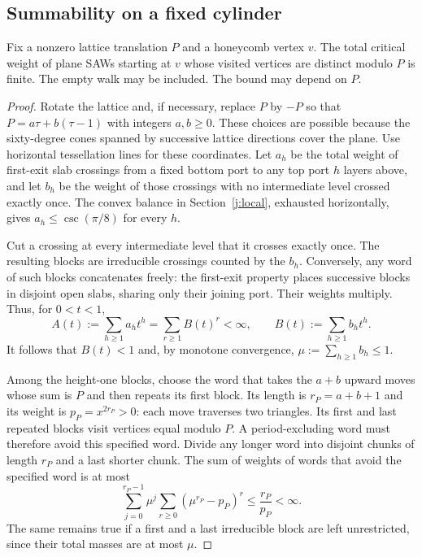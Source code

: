 \subsection{Summability on a fixed cylinder}

\begin{lemma}\label{j:period-excluded}
Fix a nonzero lattice translation $P$ and a honeycomb vertex $v$.
The total critical weight of plane SAWs starting at $v$ whose
visited vertices are distinct modulo $P$ is finite. The empty walk
may be included. The bound may depend on $P$.
\end{lemma}

\begin{proof}
Rotate the lattice and, if necessary, replace $P$ by $-P$ so that
$P=a\tau+b(\tau-1)$ with integers $a,b\ge0$. These choices are
possible because the sixty-degree cones spanned by successive
lattice directions cover the plane. Use horizontal tessellation
lines for these coordinates. Let $a_h$ be the total weight of
first-exit slab crossings from a fixed bottom port to any top port
$h$ layers above, and let $b_h$ be the weight of those crossings
with no intermediate level crossed exactly once. The convex balance
in Section~\ref{j:local}, exhausted horizontally, gives
$a_h\le\csc(\pi/8)$ for every $h$.

Cut a crossing at every intermediate level that it crosses exactly
once. The resulting blocks are irreducible crossings counted by the
$b_h$. Conversely, any word of such blocks concatenates freely:
the first-exit property places successive blocks in disjoint open
slabs, sharing only their joining port. Their weights multiply.
Thus, for $0<t<1$,
\[
 A(t):=\sum_{h\ge1}a_ht^h
   =\sum_{r\ge1}B(t)^r<\infty,\qquad
 B(t):=\sum_{h\ge1}b_ht^h.
\]
It follows that $B(t)<1$ and, by monotone convergence,
$\mu:=\sum_{h\ge1}b_h\le1$.

Among the height-one blocks, choose the word that takes the $a+b$
upward moves whose sum is $P$ and then repeats its first block.
Its length is $r_P=a+b+1$ and its weight is
$p_P=x^{2r_P}>0$: each move traverses two triangles. Its first and
last repeated blocks visit vertices equal modulo $P$. A
period-excluding word must therefore avoid this specified word.
Divide any longer word into disjoint chunks of length $r_P$ and a
last shorter chunk. The sum of weights of words that avoid the
specified word is at most
\[
 \sum_{j=0}^{r_P-1}\mu^j
       \sum_{r\ge0}(\mu^{r_P}-p_P)^r
 \le \frac{r_P}{p_P}<\infty.
\]
The same remains true if a first and a last irreducible block are
left unrestricted, since their total masses are at most $\mu$.


\end{proof}
